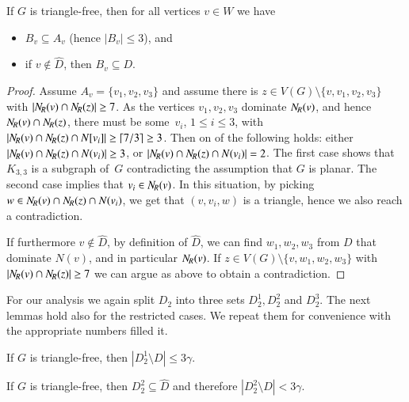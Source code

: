 \begin{lemma}\label{alem:dominating-dominators}
  If $G$ is triangle-free, then for all vertices $v\in W$ we have

  \vspace{-5pt}
  \begin{itemize}
  \item $B_v \subseteq A_v$ (hence $|B_v|\le 3$), and \smallskip
  \item if $v\not\in \hat{D}$, then $B_v\subseteq D$.
  \end{itemize}
\end{lemma}
\begin{proof}
  Assume $A_v=\{v_1,v_2, v_3\}$ and assume there is $z\in V(G)\setminus \{v,v_1,v_2, v_3\}$
  with $|N_{\hspace{-1pt}R}(v) \cap N_{\hspace{-1pt}R}(z)| \geq 7$.
  As the vertices $v_1, v_2, v_3$ dominate $N_{\hspace{-1pt}R}(v)$, and hence $N_{\hspace{-1pt}R}(v)\cap N_{\hspace{-1pt}R}(z)$,
  there must be some~$v_i$, $1\leq i\leq 3$, with
  \mbox{$|N_{\hspace{-1pt}R}(v) \cap N_{\hspace{-1pt}R}(z) \cap N[v_i]| \geq \lceil 7/3\rceil \geq 3$}.
  Then on of the following holds: either
  \mbox{$|N_{\hspace{-1pt}R}(v) \cap N_{\hspace{-1pt}R}(z) \cap N(v_i)| \geq 3$},  or
  \mbox{$|N_{\hspace{-1pt}R}(v) \cap N_{\hspace{-1pt}R}(z) \cap N(v_i)| =2$}.
  The first case shows that $K_{3,3}$ is a subgraph of~$G$
  contradicting the assumption that $G$ is planar.
  The second case implies that $v_i\in N_{\hspace{-1pt}R}(v)$. In this situation, by picking
  $w \in N_{\hspace{-1pt}R}(v) \cap N_{\hspace{-1pt}R}(z) \cap N(v_i)$, we get that $(v,v_i,w)$ is a triangle,
  hence we also reach a contradiction.

  If furthermore $v\not\in \hat{D}$, by definition of $\hat{D}$,
  we can find $w_1,w_2, w_3$ from $D$
  that dominate $N(v)$, and in particular $N_{\hspace{-1pt}R}(v)$.
  If $z\in V(G)\setminus \{v,w_1,w_2, w_3\}$
  with $|N_{\hspace{-1pt}R}(v) \cap N_{\hspace{-1pt}R}(z)| \geq 7$ we can argue as above to obtain
  a contradiction.
\end{proof}


For our analysis we again split $D_2$ into three sets $D_2^1, D_2^2$ and
$D_2^3$. The next lemmas hold also for the restricted cases. We repeat
them for convenience with the appropriate numbers filled it.

\begin{lemma}\label{alem:size-D21}
  If $G$ is triangle-free, then $|D_2^1\setminus D|\leq 3\gamma$.
\end{lemma}

\begin{lemma}\label{alem:size-D22}
  If $G$ is triangle-free, then $D_2^2 \subseteq \hat D$ and therefore
  $|D_2^2\setminus D|< 3\gamma$.
\end{lemma}

